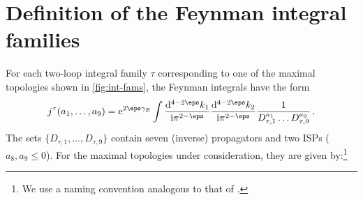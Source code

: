 \section{Definition of the Feynman integral families}
\label{app:int_def}

For each two-loop integral family $\tau$ corresponding to one of the maximal topologies shown in \cref{fig:int-fams},
the Feynman integrals have the form
\begin{equation}
	j^{\tau}(a_1, \ldots, a_9) = \mathrm{e}^{2 \eps \gamma_{E}} \int \frac{\mathrm{d}^{4-2\eps} k_1}{\mathrm{i} \pi^{2-\eps}} \frac{\mathrm{d}^{4-2\eps} k_2}{\mathrm{i} \pi^{2-\eps}} \frac{1}{D_{\tau,1}^{a_1} \ldots D_{\tau,9}^{a_9}} \,.
\end{equation}
The sets $\{D_{\tau,1}, \ldots, D_{\tau,9}\}$ contain seven (inverse) propagators and two \acp{ISP} ($a_8, a_9 \le 0$). 
For the maximal topologies under consideration, they are given by:\footnote{We use a naming convention analogous to that of .}
